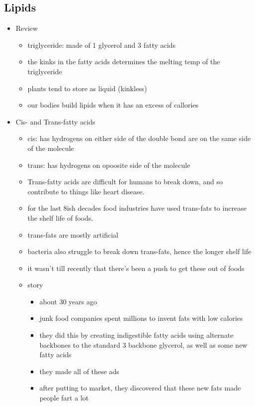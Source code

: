 \documentclass{article}
\theoremstyle{definition}
\begin{document}
\subsection{Lipids}
\begin{itemize}
	\item Review
		\begin{itemize}
			\item triglyceride: made of 1 glycerol and 3 fatty acids
			\item the kinks in the fatty acids determines the melting temp of the triglyceride
			\item plants tend to store as liquid (kinkless)
			\item our bodies build lipids when it has an excess of callories
		\end{itemize}
	\item Cis- and Trans-fatty acids
		\begin{itemize}
			\item cis: has hydrogens on either side of the double bond are on the same side of the molecule
			\item trans: has hydrogens on opoosite side of the molecule
			\item Trans-fatty acids are difficult for humans to break down, and so contribute to things like heart disease.
			\item for the last 8ish decades food industries have used trans-fats to increase the shelf life of foods.
			\item trans-fats are mostly artificial
			\item bacteria also struggle to break down trans-fats, hence the longer shelf life
			\item it wasn't till recently that there's been a push to get these out of foods
			\item story
				\begin{itemize}
					\item about 30 years ago
					\item junk food companies spent millions to invent fats with low calories
					\item they did this by creating indigestible fatty acids using alternate backbones to the standard 3 backbone glycerol, as well as some new fatty acids
					\item they made all of these ads
					\item after putting to market, they discovered that these new fats made people fart a lot
				\end{itemize}

\end{itemize}
\end{itemize}
\end{document}
